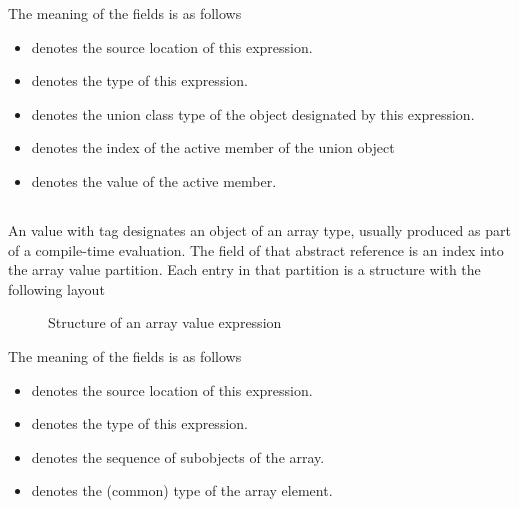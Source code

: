 The meaning of the fields is as follows
\begin{itemize}
	\item {} denotes the source location of this expression.
	\item {} denotes the type of this expression.
	\item {} denotes the union class type of the object designated by this expression.
	\item {} denotes the index of the active member of the union object
	\item {} denotes the value of the active member.
\end{itemize}




\subsection{}
\label{sec:ifc:ExprSort:SubobjectValue}




\subsection{}
\label{sec:ifc:ExprSort:ArrayValue}

An  value with tag  designates an object of an array type, usually produced as part of a compile-time evaluation.
The  field of that abstract reference is an index into the array value partition.  Each entry in that partition is a structure with the following layout
%
\begin{figure}[H]
	\centering
	\caption{Structure of an array value expression}
	\label{fig:ifc:ExprSort:ArrayValue}
\end{figure}
%
The meaning of the fields is as follows
\begin{itemize}
	\item {} denotes the source location of this expression.
	\item {} denotes the type of this expression.
	\item {} denotes the sequence of subobjects of the array.
	\item {} denotes the (common) type of the array element.
\end{itemize}

